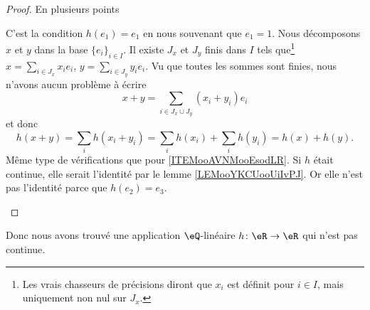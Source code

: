 \begin{proof}
	En plusieurs points
	\begin{subproof}
		 C'est la condition \( h(e_1)=e_1\) en nous souvenant que \( e_1=1\).
		 Nous décomposons \( x\) et \( y\) dans la base  \( \{ e_i \}_{i\in I}\). Il existe \( J_x\) et \( J_y \) finis dans \( I\) tels que\footnote{Les vrais chasseurs de précisions diront que \( x_i\) est définit pour \( i\in I\), mais uniquement non nul sur \( J_x\).} \( x=\sum_{i\in J_x}x_ie_i\), \( y=\sum_{i\in J_y}y_ie_i\). Vu que toutes les sommes sont finies, nous n'avons aucun problème à écrire
		\begin{equation}
			x+y=\sum_{i\in J_x\cup J_y}(x_i+y_i)e_i
		\end{equation}
		et donc
		\begin{equation}
			h(x+y)=\sum_ih(x_i+y_i)=\sum_i h(x_i)+\sum_i h(y_i)=h(x)+h(y).
		\end{equation}
		Même type de vérifications que pour \ref{ITEMooAVNMooEsodLR}.
		Si \( h\) était continue, elle serait l'identité par le lemme \ref{LEMooYKCUooUiIvPJ}. Or elle n'est pas l'identité parce que \( h(e_2)=e_3\).
	\end{subproof}
\end{proof}

Donc nous avons trouvé une application \( \eQ\)-linéaire \( h\colon \eR\to \eR\) qui n'est pas continue.
